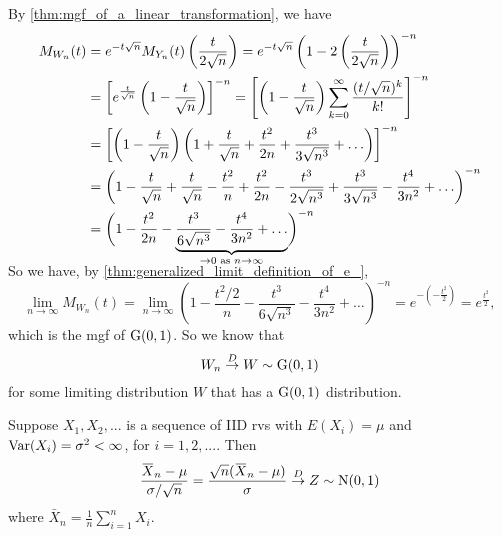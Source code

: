 \documentclass[notoc,notitlepage]{tufte-book}
\newcommand{\convd}{\overset{D}{\to}}
\begin{document}
\begin{solution}
  By \cref{thm:mgf_of_a_linear_transformation}, we have
  \begin{align*}
    M_{W_n}(t) &= e^{ - t \sqrt{n} } M_{ Y_n } (t) \left( \frac{t}{2 \sqrt{n}} \right) = e^{- t \sqrt{n}} \left( 1 - 2 \left( \frac{t}{2 \sqrt{n}} \right) \right)^{-n} \\
               &= \left[ e^{\frac{t}{\sqrt{n}}} \left( 1 - \frac{t}{\sqrt{n}} \right) \right]^{-n} = \left[ \left(1 - \frac{t}{\sqrt{n}}\right) \sum_{k=0}^{\infty} \frac{(t / \sqrt{n})^k}{k!} \right]^{-n} \\
               &= \left[ \left( 1 - \frac{t}{\sqrt{n}} \right) \left( 1 + \frac{t}{\sqrt{n}} + \frac{t^2}{2n} + \frac{t^3}{3 \sqrt{n^3}} + \hdots \right) \right]^{-n} \\
               &= \left( 1 - \frac{t}{\sqrt{n}} + \frac{t}{\sqrt{n}} - \frac{t^2}{n} + \frac{t^2}{2 n} - \frac{t^3}{2 \sqrt{n^3}} + \frac{t^3}{3 \sqrt{n^3}} - \frac{t^4}{3 n^2} + \hdots \right)^{-n} \\
               &= \left( 1 - \frac{t^2}{2n} - \smash{ \underbrace{ \frac{t^3}{6 \sqrt{n^3}} - \frac{t^4}{3n^2} + \hdots }_{\to 0 \text{ as } n \to \infty} } \right)^{-n}
  \end{align*}

  \noindent So we have, by \cref{thm:generalized_limit_definition_of_e_},
  \begin{equation*}
    \lim_{n \to \infty} M_{W_n}(t) = \lim_{n \to \infty} ( 1 - \frac{t^2 / 2}{n} - \frac{t^3}{6 \sqrt{n^3}} - \frac{t^4}{3 n^2} + \hdots )^{-n} = e^{-(- \frac{t^2}{2})} = e^{\frac{t^2}{2}},
  \end{equation*}
  which is the mgf of $\operatorname{G}(0, 1)$. So we know that
  \begin{equation*}
    W_n \convd W \sim \Gau(0, 1)
  \end{equation*}
  for some limiting distribution $W$ that has a $\operatorname{G}(0, 1)$ distribution.
\end{solution}

\begin{thm}
\label{thm:central_limit_theorem}
Suppose $X_1, X_2,...$ is a sequence of IID rvs with $E(X_i) = \mu$ and $\operatorname{Var}(X_i) = \sigma^2 < \infty$, for $i = 1, 2, ...$. Then
\begin{equation*}
  \frac{\bar{X}_n - \mu}{\sigma / \sqrt{n}} = \frac{\sqrt{n} ( \bar{X}_n - \mu )}{\sigma} \convd Z \sim \Nor(0, 1)
\end{equation*}
where $\bar{X}_n = \frac{1}{n} \sum_{i=1}^{n} X_i$.
\end{thm}
\end{document}
